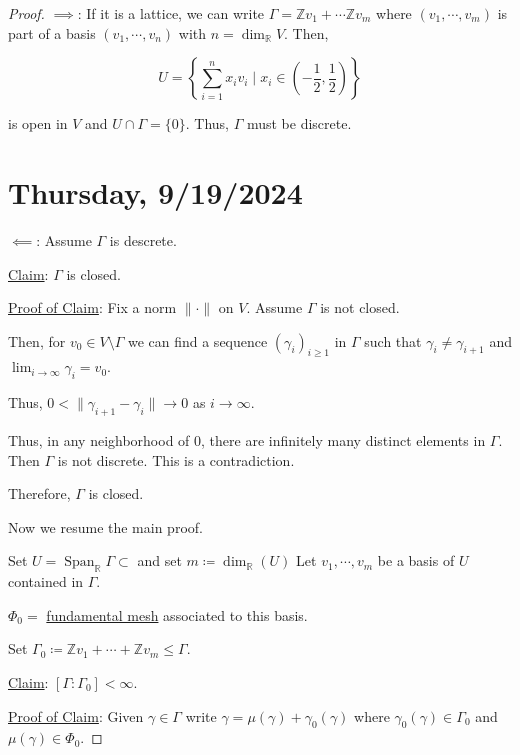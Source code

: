\documentclass[openany]{amsbook}
\numberwithin{section}{chapter}
\theoremstyle{definition}
\begin{document}
\begin{proof}
    \(\implies\): If it is a lattice, we can write \(\Gamma = \mathbb{Z} v_1 + \cdots \mathbb{Z} v_m\) where \((v_1, \cdots , v_m)\) is part of a basis \((v_1, \cdots , v_n)\) with \(n = \dim_{\mathbb{R}}V\). Then,

    \[
        U = \left\{ \sum_{i=1}^n x_i v_i \mid x_i \in \left( -\frac{1}{2}, \frac{1}{2} \right)   \right\} 
    \]

    is open in \(V\) and \(U \cap \Gamma = \{ 0 \}\). Thus, \(\Gamma\) must be discrete.

    
    \section*{Thursday, 9/19/2024}
    
    \(\impliedby\): Assume \(\Gamma\) is descrete.
    
    \underline{Claim}: \(\Gamma\) is closed.

    \underline{Proof of Claim}: Fix a norm \(\lVert \cdot \rVert \) on \(V\). Assume \(\Gamma\) is not closed.

    Then, for \(v_0 \in V \setminus \Gamma\) we can find a sequence \((\gamma_i)_{i \geq 1}\) in \(\Gamma\)  such that \(\gamma_i \neq \gamma_{i+1}\) and \(\lim_{i \to \infty} \gamma_i = v_0\). 

    Thus, \(0 < \lVert \gamma_{i+1} - \gamma_i \rVert \to 0\) as \(i \to \infty\). 

    Thus, in any neighborhood of \(0\), there are infinitely many distinct elements in \(\Gamma\). Then \(\Gamma\) is not discrete. This is a contradiction.

    Therefore, \(\Gamma\) is closed.

    Now we resume the main proof.

    Set \(U = \operatorname{Span}_\mathbb{R} \Gamma \subset\) and set \(m \coloneqq \dim_\mathbb{R} (U)\) Let \(v_1, \cdots , v_m\) be a basis of \(U\) contained in \(\Gamma\). 

    \(\Phi_0 =\) \underline{fundamental mesh} associated to this basis. 

    Set \(\Gamma_0 \coloneqq \mathbb{Z} v_1 + \cdots + \mathbb{Z} v_m \leq \Gamma\).

    \underline{Claim}: \([\Gamma : \Gamma_0] < \infty\). 

    \underline{Proof of Claim}: Given \(\gamma \in \Gamma\) write \(\gamma = \mu(\gamma) + \gamma_0(\gamma)\) where \(\gamma_0(\gamma) \in \Gamma_0\) and \(\mu(\gamma) \in \Phi_0\).


\end{proof}
\end{document}

